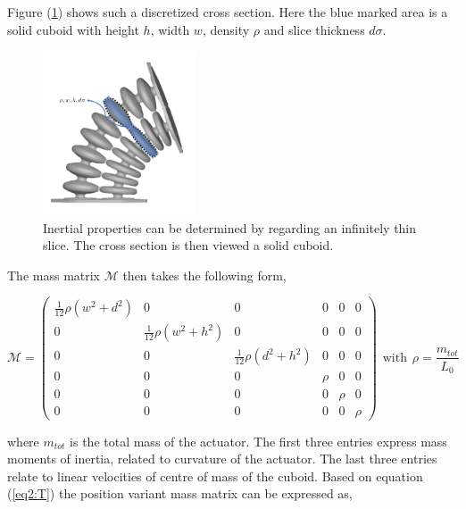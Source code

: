 Figure (\ref{fig:massapprox}) shows such a discretized cross section. Here the blue marked area is a solid cuboid with height $h$, width $w$, density $\rho$ and slice thickness $d\sigma$. 

\clearpage

\begin{figure}[H]
    \centering
    \includegraphics[width = 0.4\textwidth]{Figures/Chapter2/massapprox.png}
    \caption{Inertial properties can be determined by regarding an infinitely thin slice. The cross section is then viewed a solid cuboid.}
    \label{fig:massapprox}
\end{figure}

The mass matrix $\mathcal{M}$ then takes the following form,

\begin{equation}
    \mathcal{M} = \begin{pmatrix} \frac{1}{12}\rho (w^2 + d^2) & 0 & 0 & 0 & 0 & 0 \\
                                  0 & \frac{1}{12}\rho (w^2 + h^2) & 0 & 0 & 0 & 0 \\
                                  0 & 0 & \frac{1}{12}\rho (d^2 + h^2) & 0 & 0 & 0 \\
                                  0 & 0 & 0 & \rho & 0 & 0 \\
                                  0 & 0 & 0 & 0 & \rho & 0 \\
                                  0 & 0 & 0 & 0 & 0 & \rho \end{pmatrix}\hspace{5pt} \text{with} \hspace{5pt} \rho = \frac{m_{tot}}{L_0}
\end{equation} 




where $m_{tot}$ is the total mass of the actuator. The first three entries express mass moments of inertia, related to curvature of the actuator. The last three entries relate to linear velocities of centre of mass of the cuboid. Based on equation (\ref{eq2:T}) the position variant mass matrix can be expressed as, 



